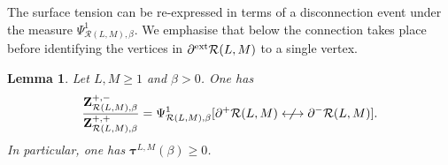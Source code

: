 \documentclass[11pt,a4paper]{article}
\numberwithin{equation}{section}
\theoremstyle{plain}
\newtheorem{Lem}[Thm]{Lemma}
\theoremstyle{definition}
\begin{document}
The surface tension can be re-expressed in terms of a disconnection event under the measure $\Psi^1_{\mathcal{R}(L,M),\beta}$. We emphasise that below the connection takes place before identifying the vertices in $\partial^{\rm ext} \mathcal{R}(L,M)$ to a single vertex. 


\begin{Lem}\label{lem: surface tension expression} 
Let $L,M\geq 1$ and $\beta>0$. One has
\begin{equation}
    \frac{\mathbf{Z}^{+,-}_{\mathcal{R}(L,M),\beta}}{\mathbf{Z}^{+,+}_{\mathcal{R}(L,M),\beta}}=\Psi^1_{\mathcal{R}(L,M),\beta}[\partial^+\mathcal{R}(L,M)\centernot\longleftrightarrow \partial^-\mathcal{R}(L,M)].
\end{equation}
In particular, one has $\boldsymbol{\tau}^{L,M}(\beta)\geq 0$. 
\end{Lem}
\end{document}
